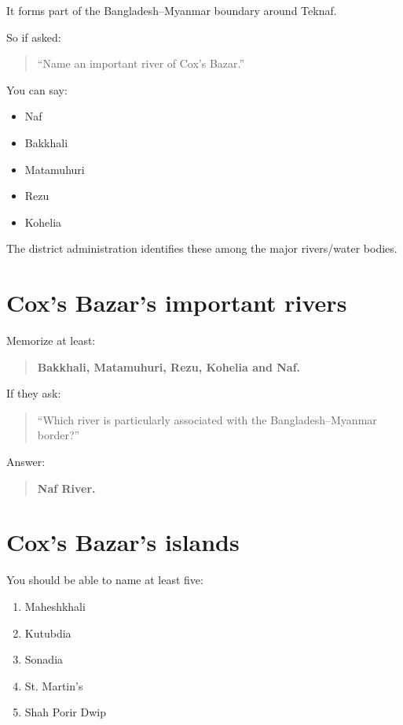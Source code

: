 It forms part of the Bangladesh--Myanmar boundary around Teknaf.

So if asked:

\begin{quote}
``Name an important river of Cox's Bazar.''\\
\end{quote}

You can say:

\begin{itemize}
  \item Naf
  \item Bakkhali
  \item Matamuhuri
  \item Rezu
  \item Kohelia
\end{itemize}

The district administration identifies these among the major rivers/water bodies.

\medskip

\section{Cox's Bazar's important rivers}

Memorize at least:

\begin{quote}
\textbf{Bakkhali, Matamuhuri, Rezu, Kohelia and Naf.}\\
\end{quote}

If they ask:

\begin{quote}
``Which river is particularly associated with the Bangladesh--Myanmar border?''\\
\end{quote}

Answer:

\begin{quote}
\textbf{Naf River.}\\
\end{quote}

\medskip

\section{Cox's Bazar's islands}

You should be able to name at least five:

\begin{enumerate}
  \item Maheshkhali
  \item Kutubdia
  \item Sonadia
  \item St. Martin's
  \item Shah Porir Dwip
\end{enumerate}

